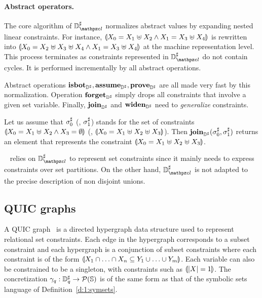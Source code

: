 \paragraph{Abstract operators.}
The core algorithm of \( \adomlin \) normalizes abstract values by
expanding nested linear constraints.
For instance, \( \llparenthesis X_0 = X_1 \mathrel{\uplus} X_2 \wedge
  X_1 = X_3 \mathrel{\uplus} X_4 \rrparenthesis \) is rewritten into
\( \llparenthesis X_0 = X_2 \mathrel{\uplus} X_3 \mathrel{\uplus} X_4 \wedge
  X_1 = X_3 \mathrel{\uplus} X_4 \rrparenthesis \) at the machine representation
level.
This process terminates as constraints represented in \( \adomlin \)
do not contain cycles.
It is performed incrementally by all abstract operations.

Abstract operations \( \textbf{isbot}_{{\mathbb{D}}^{\sharp}}, \textbf{assume}_{{\mathbb{D}}^{\sharp}}, \textbf{prove}_{{\mathbb{D}}^{\sharp}} \) are all
made very fast by this normalization.
Operation \( \textbf{forget}_{{\mathbb{D}}^{\sharp}} \) simply drops all constraints that involve
a given set variable.
Finally, \( \textbf{join}_{{\mathbb{D}}^{\sharp}} \) and \( \textbf{widen}_{{\mathbb{D}}^{\sharp}} \) need to {\em generalize}
constraints.
\begin{example}
  Let us assume that \( {\sigma}^{\sharp}_0 \) (\resp, \( {\sigma}^{\sharp}_1 \)) stands for
  the set of constraints \( \llparenthesis X_0 = X_1 \mathrel{\uplus} X_2
    \wedge X_3 = \emptyset \rrparenthesis \) (\resp, \( \llparenthesis X_0 = X_1
    \mathrel{\uplus} X_2 \mathrel{\uplus} X_3 \rrparenthesis \)).
  Then \( \textbf{join}_{{\mathbb{D}}^{\sharp}}( {\sigma}^{\sharp}_0, {\sigma}^{\sharp}_1 ) \) returns an element that
  represents the constraint \( \llparenthesis X_0 = X_1 \mathrel{\uplus} X_2
    \mathrel{\uplus} X_3 \rrparenthesis \).
\end{example}
\memcad~\cite{memcad:15:sas} relies on \( \adomlin \) to represent set
constraints since it mainly needs to express constraints over set
partitions.
On the other hand, \( \adomlin \) is not adapted to the precise
description of non disjoint unions.

\subsection{QUIC graphs}
\label{s:4:2:quic}

A QUIC graph~\cite{ab:ecoop:13} is a directed hypergraph data structure used to represent relational set constraints.  Each edge in the hypergraph corresponds to a subset constraint and each hypergraph is a conjunction of subset constraints where each constraint is of the form $\llparenthesis X_1 \cap \ldots \cap X_n \subseteq Y_1 \cup \ldots \cup Y_m \rrparenthesis$.  Each variable can also be constrained to be a singleton, with constraints such as $\llparenthesis |X| = 1 \rrparenthesis$.  The concretization $\gamma_q : {\mathbb{D}}^{\sharp}_q \rightarrow \mathcal{P}(\mathbb{S})$ is of the same form as that of the symbolic sets language of Definition~\ref{d:1:symsets}.

